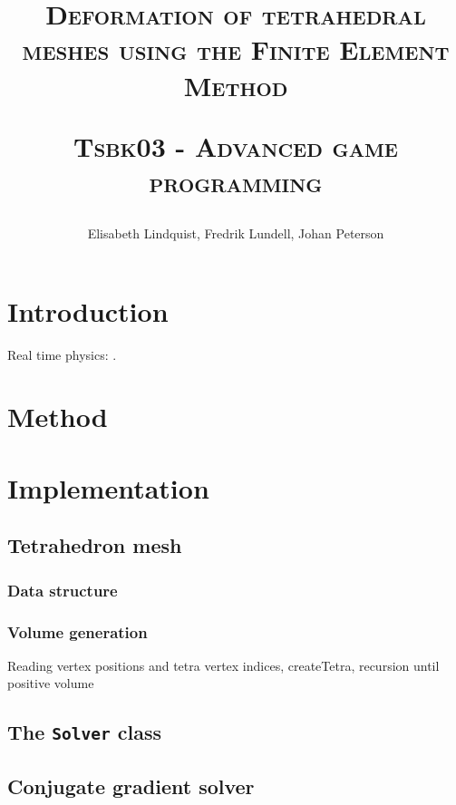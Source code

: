 \documentclass[10pt,a4paper]{article}
\author{Elisabeth Lindquist, Fredrik Lundell, Johan Peterson}
\title{\textsc{Deformation of tetrahedral meshes using the Finite Element Method}\\\begin{small}\textsc{Tsbk03 - Advanced game programming}\end{small}}
\begin{document}
\maketitle
\begin{abstract}

\end{abstract}
\pagebreak
\tableofcontents
\pagebreak

\section{Introduction}

Real time physics: \cite{rt_phys}.
\section{Method}

\subsection{}
\subsection{}
\subsection{}


\section{Implementation}


\subsection{Tetrahedron mesh}
\subsubsection{Data structure}
\subsubsection{Volume generation}
Reading vertex positions and tetra vertex indices, createTetra, recursion until positive volume

\subsection{The \texttt{Solver} class}
\subsection{Conjugate gradient solver}
\end{document}
